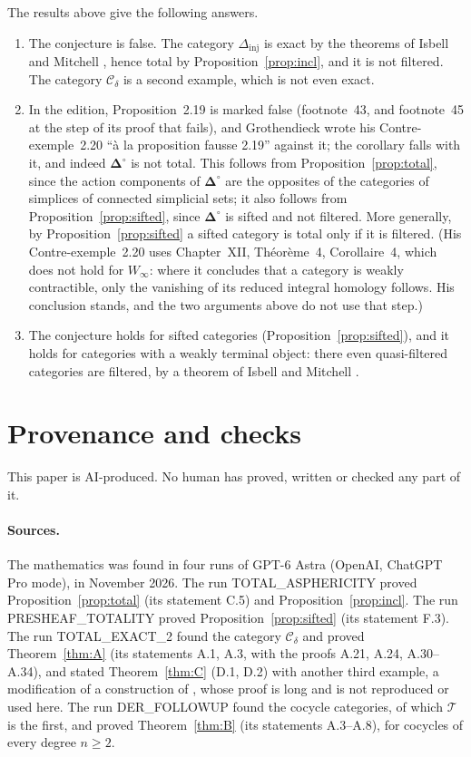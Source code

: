 \documentclass[11pt,a4paper]{article}
\theoremstyle{definition}
\newcommand{\Cd}{\mathcal{C}_{\delta}}
\begin{document}
The results above give the following answers.
\begin{enumerate}
\item The conjecture is false. The category $\Delta_{\mathrm{inj}}$ is exact
 by the theorems of Isbell and Mitchell \cite[Theorems~1 and~3]{IM73}, hence total
 by Proposition~\ref{prop:incl}, and it is not filtered. The category $\Cd$
 is a second example, which is not even exact.
\item In the edition, Proposition~2.19 is marked false (footnote~43, and
 footnote~45 at the step of its proof that fails), and Grothendieck wrote his
 Contre-exemple~2.20 ``\`a la proposition fausse 2.19'' against it; the corollary falls with it, and indeed
 $\boldsymbol\Delta^{\circ}$ is not total. This follows from
 Proposition~\ref{prop:total}, since the action components of
 $\boldsymbol\Delta^{\circ}$ are the opposites of the categories of simplices
 of connected simplicial sets; it also follows from
 Proposition~\ref{prop:sifted}, since $\boldsymbol\Delta^{\circ}$ is sifted
 and not filtered. More generally, by Proposition~\ref{prop:sifted} a sifted
 category is total only if it is filtered. (His Contre-exemple~2.20 uses
 Chapter~XII, Th\'eor\`eme~4, Corollaire~4, which does not hold for
 $W_\infty$: where it concludes that a category is weakly contractible, only
 the vanishing of its reduced integral homology follows. His conclusion
 stands, and the two arguments above do not use that step.)
\item The conjecture holds for sifted categories
 (Proposition~\ref{prop:sifted}), and it holds for categories with a weakly
 terminal object: there even quasi-filtered categories are filtered, by a
 theorem of Isbell and Mitchell \cite[Corollary~4.4]{IM76}.
\end{enumerate}
\section{Provenance and checks}\label{sec:provenance}

This paper is AI-produced. No human has proved, written or checked any part
of it.

\paragraph{Sources.} The mathematics was found in four runs of GPT-6 Astra
(OpenAI, ChatGPT Pro mode), in November 2026. The run TOTAL\_ASPHERICITY proved
Proposition~\ref{prop:total} (its statement C.5) and
Proposition~\ref{prop:incl}. The run PRESHEAF\_TOTALITY proved
Proposition~\ref{prop:sifted} (its statement F.3). The run TOTAL\_EXACT\_2
found the category $\Cd$ and proved Theorem~\ref{thm:A} (its statements A.1,
A.3, with the proofs A.21, A.24, A.30--A.34), and stated
Theorem~\ref{thm:C} (D.1, D.2) with another third example, a modification of
a construction of \cite{AKR}, whose proof is long and is not reproduced or
used here. The run DER\_FOLLOWUP found the cocycle categories, of which
$\mathcal T$ is the first, and proved Theorem~\ref{thm:B} (its statements
A.3--A.8), for cocycles of every degree $n\ge 2$.
\end{document}

